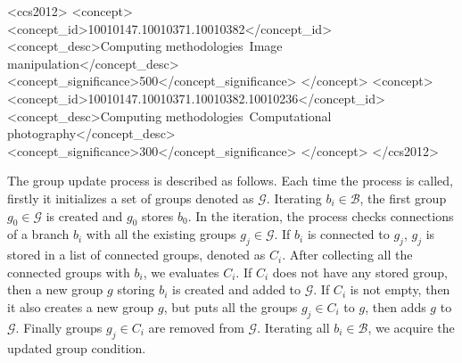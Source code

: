 \documentclass[review]{acmsiggraph}
\begin{document}
\maketitle


\linenumbers

%
%
\begin{CCSXML}
<ccs2012>
<concept>
<concept_id>10010147.10010371.10010382</concept_id>
<concept_desc>Computing methodologies~Image manipulation</concept_desc>
<concept_significance>500</concept_significance>
</concept>
<concept>
<concept_id>10010147.10010371.10010382.10010236</concept_id>
<concept_desc>Computing methodologies~Computational photography</concept_desc>
<concept_significance>300</concept_significance>
</concept>
</ccs2012>
\end{CCSXML}


\keywordlist

\conceptlist

\printcopyright











\nocite{*}

%
\appendix
{}
The group update process is described as follows.
Each time the process is called, firstly it initializes a set of groups denoted as $\mathcal{G}$.
Iterating $b_i \in \mathcal{B}$, the first group $g_0 \in \mathcal{G}$ is created and $g_0$ stores $b_0$.
In the iteration, the process checks connections of a branch $b_i$ with all the existing groups $ g_j \in \mathcal{G}$.
If $b_i$ is connected to $g_j$, $g_j$ is stored in a list of connected groups, denoted as $C_i$.
After collecting all the connected groups with $b_i$, we evaluates $C_i$.
If $C_i$ does not have any stored group, then a new group $g$ storing $b_i$ is created and added to $\mathcal{G}$.
If $C_i$ is not empty, then it also creates a new group $g$, but puts all the groups $g_j \in C_i$ to $g$, then adds $g$ to $\mathcal{G}$.
Finally groups $g_j \in C_i$ are removed from $\mathcal{G}$.
Iterating all $b_i \in \mathcal{B}$, we acquire the updated group condition.
\end{document}

